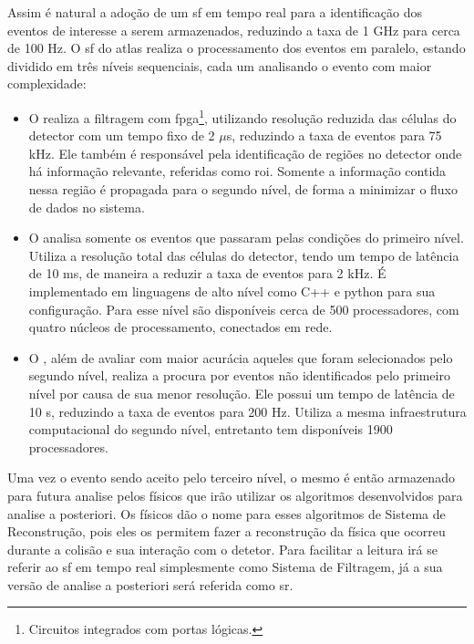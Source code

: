 Assim é natural a adoção de um \glsdesc{sf} em tempo real para a
identificação dos eventos de interesse a serem armazenados, reduzindo a taxa de 1 GHz
para cerca de 100 Hz. O \glsdesc{sf} do \gls{atlas} realiza o processamento dos 
eventos em paralelo, estando dividido em três níveis sequenciais, cada um 
analisando o evento com maior complexidade:


\begin{itemize}
\item O  realiza a filtragem com
\gls{fpga}\footnote{Circuitos integrados com portas lógicas.}, 
utilizando resolução reduzida das células do detector
com um tempo fixo de 2 $\mu$s, reduzindo a taxa de eventos para
75 kHz. Ele também é responsável pela identificação de regiões no detector onde
há informação relevante, referidas como \gls{roi}. Somente a
informação contida nessa região é propagada para o segundo nível, de forma a
minimizar o fluxo de dados no sistema.
\item O  analisa somente os eventos que passaram pelas condições do
primeiro nível. Utiliza a resolução total das células do detector, 
tendo um tempo de latência de 10 ms, de maneira a reduzir a taxa de eventos para
2 kHz. É implementado em linguagens de alto nível como C++ e python para sua configuração. 
Para esse nível são disponíveis cerca de 500 processadores, com quatro
núcleos de processamento, conectados em rede.
\item O , além de avaliar com maior acurácia aqueles que foram
selecionados pelo segundo nível, realiza a procura por eventos não identificados pelo
primeiro nível por causa de sua menor resolução. Ele possui um tempo de 
latência de 10 s, reduzindo a taxa de eventos para 200 Hz. Utiliza a mesma
infraestrutura computacional do segundo nível, entretanto tem disponíveis 1900
processadores.
\end{itemize}

Uma vez o evento sendo aceito pelo terceiro nível, o mesmo é então armazenado
para futura analise pelos físicos que irão utilizar os algoritmos desenvolvidos 
para analise a posteriori. Os físicos dão o nome para esses algoritmos de Sistema de
Reconstrução, pois eles os permitem fazer a reconstrução da física que ocorreu
durante a colisão e sua interação com o detetor. Para facilitar a leitura irá se 
referir ao \glsdesc{sf} em tempo real simplesmente como Sistema de 
Filtragem, já a sua versão de analise a posteriori será referida como \glsdesc{sr}.

